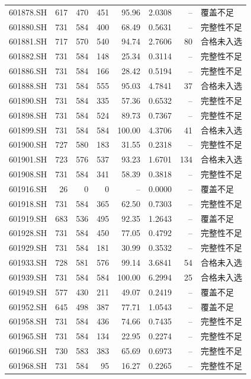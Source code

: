 \documentclass[10pt,a4paper]{article}
\begin{document}
\begin{longtable}{lrrr r r r l}
601878.SH & 617 & 470 & 451 & 95.96 & 2.0308 & -- & 覆盖不足\\
601880.SH & 731 & 584 & 400 & 68.49 & 0.5631 & -- & 完整性不足\\
601881.SH & 717 & 570 & 540 & 94.74 & 2.7606 & 80 & 合格未入选\\
601882.SH & 731 & 584 & 148 & 25.34 & 0.3114 & -- & 完整性不足\\
601886.SH & 731 & 584 & 166 & 28.42 & 0.5194 & -- & 完整性不足\\
601888.SH & 731 & 584 & 555 & 95.03 & 4.7841 & 37 & 合格未入选\\
601890.SH & 731 & 584 & 335 & 57.36 & 0.6532 & -- & 完整性不足\\
601898.SH & 731 & 584 & 524 & 89.73 & 0.7367 & -- & 完整性不足\\
601899.SH & 731 & 584 & 584 & 100.00 & 4.3706 & 41 & 合格未入选\\
601900.SH & 727 & 580 & 183 & 31.55 & 0.2318 & -- & 完整性不足\\
601901.SH & 723 & 576 & 537 & 93.23 & 1.6701 & 134 & 合格未入选\\
601908.SH & 731 & 584 & 341 & 58.39 & 0.3818 & -- & 完整性不足\\
601916.SH & 26 & 0 & 0 & -- & 0.0000 & -- & 覆盖不足\\
601918.SH & 731 & 584 & 365 & 62.50 & 0.7303 & -- & 完整性不足\\
601919.SH & 683 & 536 & 495 & 92.35 & 1.2643 & -- & 覆盖不足\\
601928.SH & 731 & 584 & 450 & 77.05 & 0.4792 & -- & 完整性不足\\
601929.SH & 731 & 584 & 181 & 30.99 & 0.3532 & -- & 完整性不足\\
601933.SH & 728 & 581 & 576 & 99.14 & 3.6841 & 54 & 合格未入选\\
601939.SH & 731 & 584 & 584 & 100.00 & 6.2994 & 25 & 合格未入选\\
601949.SH & 577 & 430 & 211 & 49.07 & 0.2419 & -- & 覆盖不足\\
601952.SH & 645 & 498 & 387 & 77.71 & 1.0543 & -- & 覆盖不足\\
601958.SH & 731 & 584 & 436 & 74.66 & 0.7435 & -- & 完整性不足\\
601965.SH & 731 & 584 & 134 & 22.95 & 0.2274 & -- & 完整性不足\\
601966.SH & 730 & 583 & 383 & 65.69 & 0.6973 & -- & 完整性不足\\
601968.SH & 731 & 584 & 95 & 16.27 & 0.2265 & -- & 完整性不足\\

\end{longtable}
\end{document}
